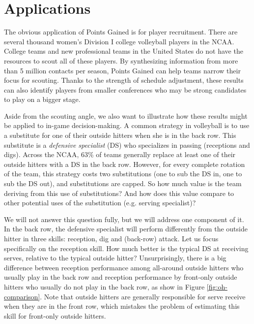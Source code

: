 \documentclass{article}
\begin{document}
\section{Applications}
\label{sec:applications}

The obvious application of Points Gained is for player recruitment. There are several thousand women's Division I college volleyball players in the NCAA. College teams and new professional teams in the United States do not have the resources to scout all of these players. By synthesizing information from more than 5 million contacts per season, Points Gained can help teams narrow their focus for scouting. Thanks to the strength of schedule adjustment, these results can also identify players from smaller conferences who may be strong candidates to play on a bigger stage.

Aside from the scouting angle, we also want to illustrate how these results might be applied to in-game decision-making. A common strategy in volleyball is to use a substitute for one of their outside hitters when she is in the back row. This substitute is a {\it defensive specialist} (DS) who specializes in passing (receptions and digs). Across the NCAA, 63\% of teams generally replace at least one of their outside hitters with a DS in the back row. However, for every complete rotation of the team, this strategy costs two substitutions (one to sub the DS in, one to sub the DS out), and substitutions are capped. So how much value is the team deriving from this use of substitutions? And how does this value compare to other potential uses of the substitution (e.g. serving specialist)?

We will not answer this question fully, but we will address one component of it. In the back row, the defensive specialist will perform differently from the outside hitter in three skills: reception, dig and (back-row) attack. Let us focus specifically on the reception skill. How much better is the typical DS at receiving serves, relative to the typical outside hitter? Unsurprisingly, there is a big difference between reception performance among all-around outside hitters who usually play in the back row and reception performance by front-only outside hitters who usually do not play in the back row, as show in Figure \ref{fig:oh-comparison}. Note that outside hitters are generally responsible for serve receive when they are in the front row, which mistakes the problem of estimating this skill for front-only outside hitters.
\end{document}

